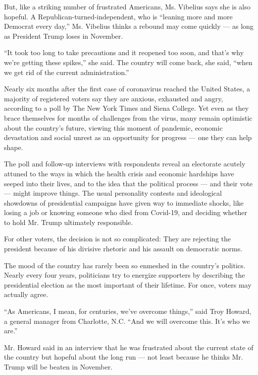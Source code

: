 But, like a striking number of frustrated Americans, Ms. Vibelius says
she is also hopeful. A Republican-turned-independent, who is ``leaning
more and more Democrat every day,'' Ms. Vibelius thinks a rebound may
come quickly --- as long as President Trump loses in November.

``It took too long to take precautions and it reopened too soon, and
that's why we're getting these spikes,'' she said. The country will come
back, she said, ``when we get rid of the current administration.''

Nearly six months after the first case of coronavirus reached the United
States, a majority of registered voters say they are anxious, exhausted
and angry, according to a poll by The New York Times and Siena College.
Yet even as they brace themselves for months of challenges from the
virus, many remain optimistic about the country's future, viewing this
moment of pandemic, economic devastation and social unrest as an
opportunity for progress --- one they can help shape.

The poll and follow-up interviews with respondents reveal an electorate
acutely attuned to the ways in which the health crisis and economic
hardships have seeped into their lives, and to the idea that the
political process --- and their vote --- might improve things. The usual
personality contests and ideological showdowns of presidential campaigns
have given way to immediate shocks, like losing a job or knowing someone
who died from Covid-19, and deciding whether to hold Mr. Trump
ultimately responsible.

For other voters, the decision is not so complicated: They are rejecting
the president because of his divisive rhetoric and his assault on
democratic norms.

The mood of the country has rarely been so enmeshed in the country's
politics. Nearly every four years, politicians try to energize
supporters by describing the presidential election as the most important
of their lifetime. For once, voters may actually agree.

``As Americans, I mean, for centuries, we've overcome things,'' said
Troy Howard, a general manager from Charlotte, N.C. ``And we will
overcome this. It's who we are.''

Mr. Howard said in an interview that he was frustrated about the current
state of the country but hopeful about the long run --- not least
because he thinks Mr. Trump will be beaten in November.

